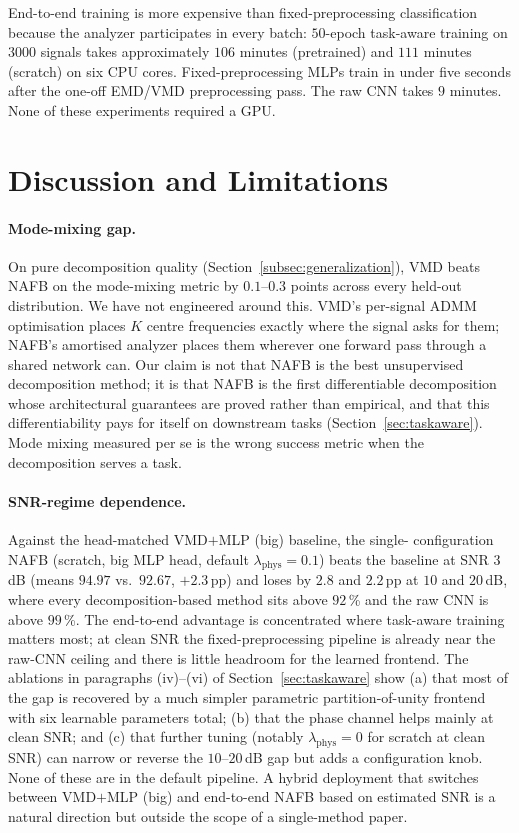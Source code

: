 \documentclass[journal]{IEEEtran}
\theoremstyle{remark}
\begin{document}
End-to-end training is more expensive than fixed-preprocessing
classification because the analyzer participates in every batch:
$50$-epoch task-aware training on $3000$ signals takes approximately
$106$ minutes (pretrained) and $111$ minutes (scratch) on six CPU
cores. Fixed-preprocessing MLPs train in under five seconds after the
one-off EMD/VMD preprocessing pass. The raw CNN takes $9$ minutes.
None of these experiments required a GPU.

\section{Discussion and Limitations}
\label{sec:discussion}

\paragraph{Mode-mixing gap.}
On pure decomposition quality (Section~\ref{subsec:generalization}),
VMD beats NAFB on the mode-mixing metric by $0.1$--$0.3$ points
across every held-out distribution. We have not engineered around
this. VMD's per-signal ADMM optimisation places $K$ centre frequencies
exactly where the signal asks for them; NAFB's amortised analyzer
places them wherever one forward pass through a shared network can.
Our claim is not that NAFB is the best unsupervised decomposition
method; it is that NAFB is the first differentiable decomposition
whose architectural guarantees are proved rather than empirical, and
that this differentiability pays for itself on downstream tasks
(Section~\ref{sec:taskaware}). Mode mixing measured per se is the
wrong success metric when the decomposition serves a task.

\paragraph{SNR-regime dependence.}
Against the head-matched VMD$+$MLP (big) baseline, the single-
configuration NAFB (scratch, big MLP head, default
$\lambda_{\text{phys}} = 0.1$) beats the baseline at SNR $3$\,dB
(means $94.97$ vs.\ $92.67$, $+2.3$\,pp) and loses by $2.8$ and
$2.2$\,pp at $10$ and $20$\,dB, where every decomposition-based
method sits above $92$\,\% and the raw CNN is above $99$\,\%. The
end-to-end advantage is concentrated where task-aware training
matters most; at clean SNR the fixed-preprocessing pipeline is
already near the raw-CNN ceiling and there is little headroom for
the learned frontend. The ablations in paragraphs (iv)--(vi) of
Section~\ref{sec:taskaware} show (a) that most of the gap is recovered
by a much simpler parametric partition-of-unity frontend with six
learnable parameters total; (b) that the phase channel helps mainly
at clean SNR; and (c) that further tuning (notably
$\lambda_{\text{phys}} = 0$ for scratch at clean SNR) can narrow or
reverse the $10$--$20$\,dB gap but adds a configuration knob. None of
these are in the default pipeline. A hybrid deployment that
switches between VMD$+$MLP (big) and end-to-end NAFB based on
estimated SNR is a natural direction but outside the scope of a
single-method paper.
\end{document}
